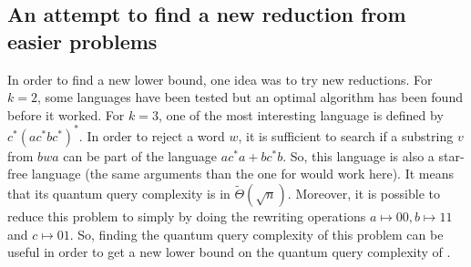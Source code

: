 \subsection{An attempt to find a new reduction from easier problems}

In order to find a new lower bound, one idea was to try new reductions.
For $k=2$, some languages have been tested but an optimal algorithm
has been found before it worked. For $k=3$, one of the most interesting
language is defined by $c^*(ac^*bc^*)^*$.
In order to reject a word $w$, it is sufficient to search if a substring $v$
from $bwa$ can be part of the language $ac^*a+bc^*b$. So, this language is also
a star-free language (the same arguments than the one for  would work
here). It means that its quantum query complexity is in $\tilde{\Theta}(\sqrt{n})$.
Moreover, it is possible to reduce this problem to  simply by doing
the rewriting operations $a \mapsto 00, b\mapsto 11$ and $c \mapsto 01$. So,
finding the quantum query complexity of this problem can be useful in order
to get a new lower bound on the quantum query complexity of .